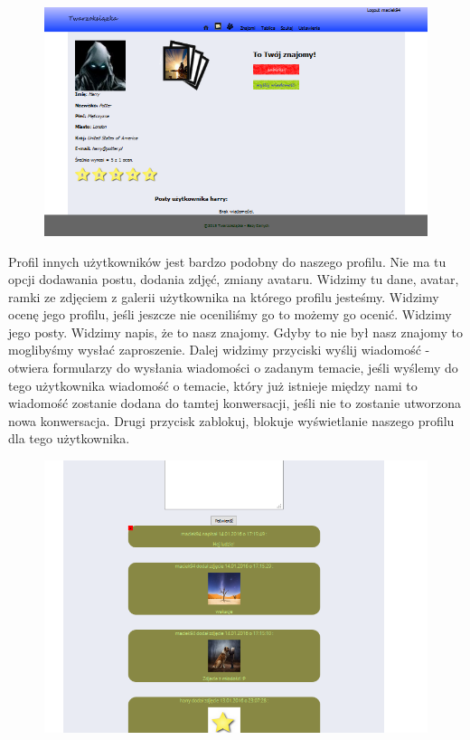 \documentclass[a4paper,10pt,table]{article}
\begin{document}
\begin{figure}[h]
\begin{center}
\includegraphics[scale=0.6]{scrn/8}
\end{center}
\end{figure}\newline
Profil innych użytkowników jest bardzo podobny do naszego profilu. Nie ma tu opcji dodawania postu, dodania zdjęć, zmiany avataru. Widzimy tu dane, avatar, ramki ze zdjęciem z galerii użytkownika na którego profilu jesteśmy. Widzimy ocenę jego profilu, jeśli jeszcze nie oceniliśmy go to możemy go ocenić. Widzimy jego posty. Widzimy napis, że to nasz znajomy. Gdyby to nie był nasz znajomy to moglibyśmy wysłać zaproszenie. Dalej widzimy przyciski wyślij wiadomość - otwiera formularzy do wysłania wiadomości o zadanym temacie, jeśli wyślemy do tego użytkownika wiadomość o temacie, który już istnieje między nami to wiadomość zostanie dodana do tamtej konwersacji, jeśli nie to zostanie utworzona nowa konwersacja. Drugi przycisk zablokuj, blokuje wyświetlanie naszego profilu dla tego użytkownika.
\newpage
\begin{figure}[h]
\begin{center}
\includegraphics[scale=0.5]{scrn/9}
\end{center}
\end{figure}
\end{document}
